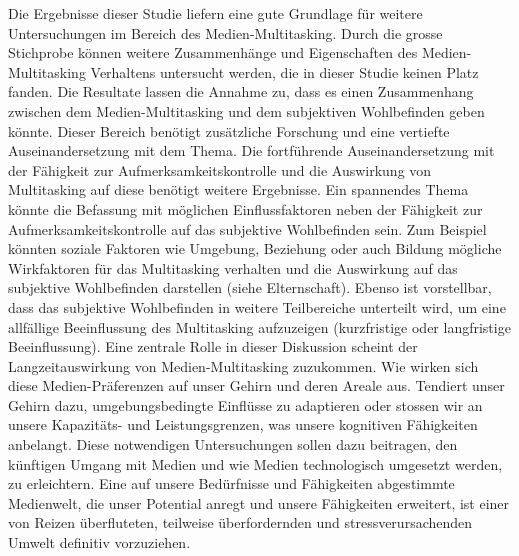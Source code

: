 \label{section.diskussion.ausblick}
Die Ergebnisse dieser Studie liefern eine gute Grundlage für weitere Untersuchungen im Bereich des Medien-Multitasking. Durch die grosse Stichprobe können weitere Zusammenhänge und Eigenschaften des Medien-Multitasking Verhaltens untersucht werden, die in dieser Studie keinen Platz fanden. Die Resultate lassen die Annahme zu, dass es einen Zusammenhang zwischen dem Medien-Multitasking und dem subjektiven Wohlbefinden geben könnte. Dieser Bereich benötigt zusätzliche Forschung und eine vertiefte Auseinandersetzung mit dem Thema. Die fortführende Auseinandersetzung mit der Fähigkeit zur Aufmerksamkeitskontrolle und die Auswirkung von Multitasking auf diese benötigt weitere Ergebnisse. Ein spannendes Thema könnte die Befassung mit möglichen Einflussfaktoren neben der Fähigkeit zur Aufmerksamkeitskontrolle auf das subjektive Wohlbefinden sein. Zum Beispiel könnten soziale Faktoren wie Umgebung, Beziehung oder auch Bildung mögliche Wirkfaktoren für das Multitasking verhalten und die Auswirkung auf das subjektive Wohlbefinden darstellen (siehe Elternschaft). Ebenso ist vorstellbar, dass das subjektive Wohlbefinden in weitere Teilbereiche unterteilt wird, um eine allfällige Beeinflussung des Multitasking aufzuzeigen (kurzfristige oder langfristige Beeinflussung). Eine zentrale Rolle in dieser Diskussion scheint der Langzeitauswirkung von Medien-Multitasking zuzukommen. Wie wirken sich diese Medien-Präferenzen auf unser Gehirn und deren Areale aus. Tendiert unser Gehirn dazu, umgebungsbedingte Einflüsse zu adaptieren oder stossen wir an unsere Kapazitäts- und Leistungsgrenzen, was unsere kognitiven Fähigkeiten anbelangt. Diese notwendigen Untersuchungen sollen dazu beitragen, den künftigen Umgang mit Medien und wie Medien technologisch umgesetzt werden, zu erleichtern. Eine auf unsere Bedürfnisse und Fähigkeiten abgestimmte Medienwelt, die unser Potential anregt und unsere Fähigkeiten erweitert, ist einer von Reizen überfluteten, teilweise überfordernden und stressverursachenden Umwelt definitiv vorzuziehen. 

